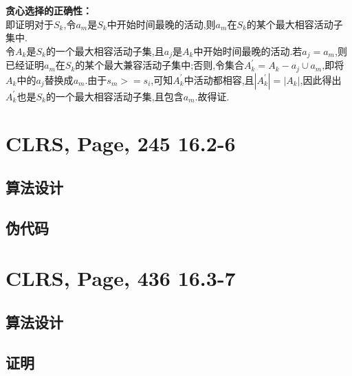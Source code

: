 \documentclass[UTF8]{ctexart}
\begin{document}
\textbf{贪心选择的正确性：}\\
即证明对于$S_k$,令$a_m$是$S_k$中开始时间最晚的活动,则$a_m$在$S_k$的某个最大相容活动子集中.\\
令$A_k$是$S_k$的一个最大相容活动子集,且$a_j$是$A_k$中开始时间最晚的活动.若$a_j=a_m$,则已经证明$a_m$在$S_k$的某个最大兼容活动子集中;否则,令集合$A^\prime_k=A_k-{a_j}\cup {a_m}$,即将$A_k$中的$a_j$替换成$a_m$.由于$s_m>=s_i$,可知$A^\prime_k$中活动都相容,且$|A^\prime_k|=|A_k|$,因此得出$A^\prime_k$也是$S_k$的一个最大相容活动子集,且包含$a_m$.故得证.


\section{CLRS, Page, 245 16.2-6}

\subsection{算法设计}

\subsection{伪代码}

  

\section{CLRS, Page, 436 16.3-7}

\subsection{算法设计}

\subsection{证明}
\end{document}
